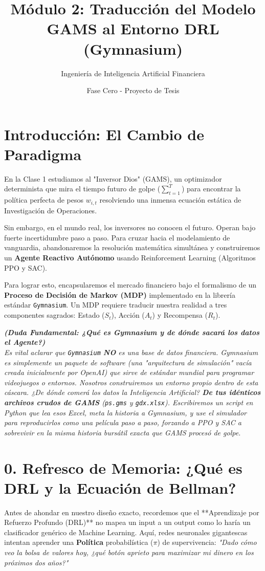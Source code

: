 \documentclass[11pt]{article}
\title{Módulo 2: Traducción del Modelo GAMS al Entorno DRL (Gymnasium)}
\author{Ingeniería de Inteligencia Artificial Financiera}
\date{Fase Cero - Proyecto de Tesis}
\begin{document}
\maketitle

\section{Introducción: El Cambio de Paradigma}
En la Clase 1 estudiamos al "Inversor Dios" (GAMS), un optimizador determinista que mira el tiempo futuro de golpe ($\sum_{t=1}^T$) para encontrar la política perfecta de pesos $w_{i,t}$ resolviendo una inmensa ecuación estática de Investigación de Operaciones.

Sin embargo, en el mundo real, los inversores no conocen el futuro. Operan bajo fuerte incertidumbre paso a paso. Para cruzar hacia el modelamiento de vanguardia, abandonaremos la resolución matemática simultánea y construiremos un \textbf{Agente Reactivo Autónomo} usando Reinforcement Learning (Algoritmos PPO y SAC).

Para lograr esto, encapsularemos el mercado financiero bajo el formalismo de un \textbf{Proceso de Decisión de Markov (MDP)} implementado en la librería estándar \texttt{Gymnasium}. Un MDP requiere traducir nuestra realidad a tres componentes sagrados: Estado ($S_t$), Acción ($A_t$) y Recompensa ($R_t$).

\vspace{2mm}
\textit{\textbf{(Duda Fundamental: ¿Qué es Gymnasium y de dónde sacará los datos el Agente?)}}\\
\textit{Es vital aclarar que \texttt{Gymnasium} \textbf{NO} es una base de datos financiera. Gymnasium es simplemente un paquete de software (una "arquitectura de simulación" vacía creada inicialmente por OpenAI) que sirve de estándar mundial para programar videojuegos o entornos. Nosotros construiremos un entorno propio dentro de esta cáscara. ¿De dónde comerá los datos la Inteligencia Artificial? \textbf{De tus idénticos archivos crudos de GAMS} (\texttt{ps.gms} y \texttt{gdx.xlsx}). Escribiremos un script en Python que lea esos Excel, meta la historia a Gymnasium, y use el simulador para reproducirlos como una película paso a paso, forzando a PPO y SAC a sobrevivir en la misma historia bursátil exacta que GAMS procesó de golpe.}
\vspace{2mm}

\section{0. Refresco de Memoria: ¿Qué es DRL y la Ecuación de Bellman?}
Antes de ahondar en nuestro diseño exacto, recordemos que el **Aprendizaje por Refuerzo Profundo (DRL)** no mapea un input a un output como lo haría un clasificador genérico de Machine Learning. Aquí, redes neuronales gigantescas intentan aprender una \textbf{Política} probabilística ($\pi$) de supervivencia: \textit{"Dado cómo veo la bolsa de valores hoy, ¿qué botón aprieto para maximizar mi dinero en los próximos dos años?"}
\end{document}
